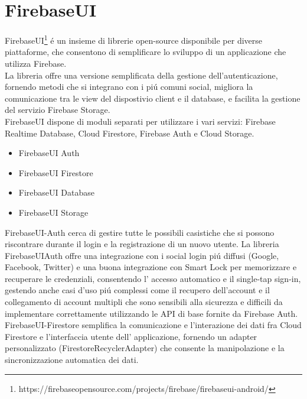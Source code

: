 \section{FirebaseUI}                 %
FirebaseUI\footnote{https://firebaseopensource.com/projects/firebase/firebaseui-android/} \'e un insieme di librerie open-source disponibile per diverse piattaforme, che consentono di semplificare lo sviluppo di un applicazione che utilizza Firebase.\\
La libreria offre una versione semplificata della gestione dell'autenticazione, fornendo metodi che si integrano con i pi\'u comuni social, migliora la comunicazione tra le view del dispostivio client e il database, e facilita la gestione del servizio Firebase Storage.\\
FirebaseUI dispone di moduli separati per utilizzare i vari servizi: Firebase Realtime Database, Cloud Firestore, Firebase Auth e Cloud Storage.
\begin{itemize}
  \item  FirebaseUI Auth
  \item  FirebaseUI Firestore
  \item  FirebaseUI Database
  \item  FirebaseUI Storage
\end{itemize}


FirebaseUI-Auth cerca di gestire tutte le possibili casistiche che si possono riscontrare durante il login e la registrazione di un nuovo utente.
La libreria FirebaseUIAuth offre una integrazione con i social login pi\'u diffusi (Google, Facebook, Twitter) e una buona integrazione con Smart Lock per memorizzare e recuperare le credenziali, consentendo l' accesso automatico e il single-tap sign-in, gestendo anche casi d'uso pi\'u complessi come il recupero dell'account e il collegamento di account multipli che sono sensibili alla sicurezza e difficili da implementare correttamente utilizzando le API di base fornite da Firebase Auth.\\
FirebaseUI-Firestore semplifica la comunicazione e l'interazione dei dati fra Cloud Firestore e l'interfaccia utente dell' applicazione, fornendo un adapter personalizzato  (FirestoreRecyclerAdapter) che consente la manipolazione e la sincronizzazione automatica dei dati.

\clearpage{\pagestyle{empty}\cleardoublepage}
